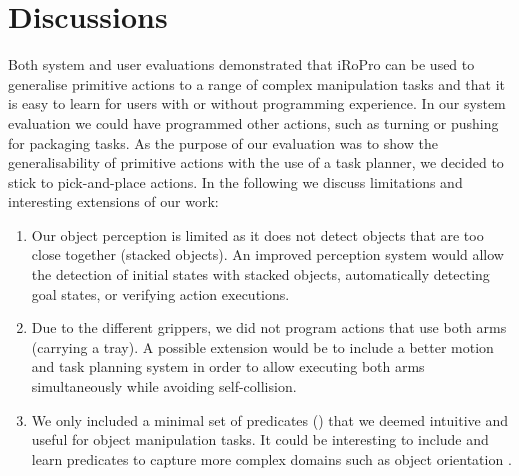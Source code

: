 \section{Discussions}
\label{sec:discussions}
Both system and user evaluations demonstrated that iRoPro can be used to generalise primitive actions to a range of complex manipulation tasks and that it is easy to learn for users with or without programming experience.
In our system evaluation we could have programmed other actions, such as turning or pushing for packaging tasks.
As the purpose of our evaluation was to show the generalisability of primitive actions with the use of a task planner, we decided to stick to pick-and-place actions.
In the following we discuss limitations and interesting extensions of our work:
\begin{enumerate}
	\item Our object perception is limited as it does not detect objects that are too close together (\eg stacked objects).
	An improved perception system would allow the detection of initial states with stacked objects, automatically detecting goal states, or verifying action executions.
	\item Due to the different grippers, we did not program actions that use both arms (\eg carrying a tray). A possible extension would be to include a better motion and task planning system in order to allow executing both arms simultaneously while avoiding self-collision.
	\item We only included a minimal set of predicates () that we deemed intuitive and useful for object manipulation tasks.
	It could be interesting to include and learn predicates to capture more complex domains such as object orientation \cite{li2016learning}.
\end{enumerate}

